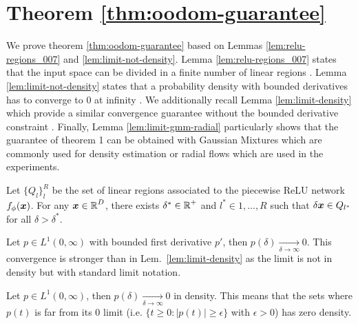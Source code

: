 \section{Theorem \ref{thm:oodom-guarantee}}
\label{sec:proofs_007}

We prove theorem \ref{thm:oodom-guarantee} based on Lemmas \ref{lem:relu-regions_007} and \ref{lem:limit-not-density}. Lemma \ref{lem:relu-regions_007} states that the input space can be divided in a finite number of linear regions \citep{understanding-nn-relu}. Lemma \ref{lem:limit-not-density} states that a probability density with bounded derivatives has to converge to $0$ at infinity \citep{limit-existence-infinity}. We additionally recall Lemma \ref{lem:limit-density} which provide a similar convergence guarantee without the bounded derivative constraint \citep{integrable-infinity}. Finally, Lemma \ref{lem:limit-gmm-radial} particularly shows that the guarantee of theorem 1 can be obtained with Gaussian Mixtures which are commonly used for density estimation or radial flows which are used in the experiments.

\begin{lemma}
\label{lem:relu-regions_007}
\citep{understanding-nn-relu} Let $\{Q_l\}_l^{R}$ be the set of linear regions associated to the piecewise ReLU network $f_{\phi}(\bm{x})$. For any $\bm{x} \in \operatorname{\mathbb{R}}^D$, there exists $\delta^* \in \operatorname{\mathbb{R}}^{+}$ and $l^*\in {1,..., R}$ such that $\delta \bm{x} \in Q_{l^*}$ for all $\delta > \delta^*$.
\end{lemma}

\begin{lemma}
\label{lem:limit-not-density}
\citep{limit-existence-infinity} Let $p \in L^1(0, \infty)$ with bounded first derivative $p'$, then $p(\delta)\underset{\delta \rightarrow \infty}{\rightarrow} 0$. This convergence is stronger than in Lem.~\ref{lem:limit-density} as the limit is not in density but with standard limit notation.
\end{lemma}

\begin{lemma}
\label{lem:limit-density}
\citep{integrable-infinity} Let $p \in L^1(0, \infty)$, then $p(\delta)\underset{\delta \rightarrow \infty}{\rightarrow} 0$ in density. This means that the sets where $p(t)$ is far from its $0$ limit (i.e. $\{ t \geq 0: |p(t)| \geq \epsilon \}$ with $\epsilon > 0$) has zero density.
\end{lemma}

